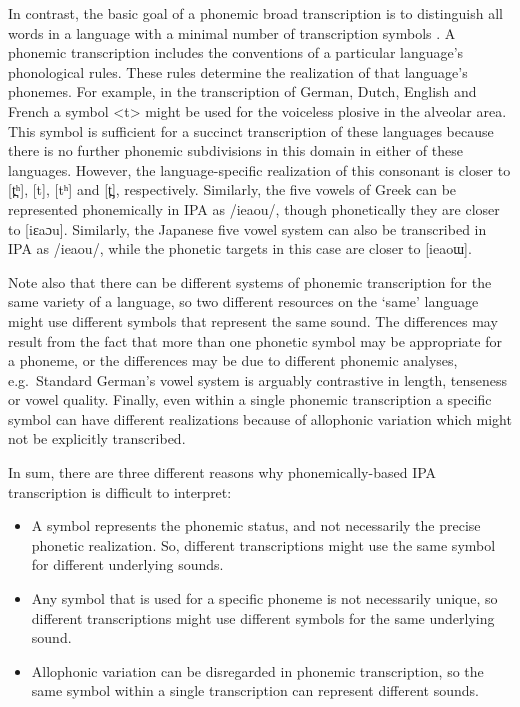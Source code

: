 In contrast, the basic goal of a phonemic broad transcription is to distinguish all
words in a language with a minimal number of transcription symbols
\citep[19]{Abercrombie1964}. A phonemic transcription includes the conventions
of a particular language's phonological rules. These rules determine the
realization of that language's phonemes. For example, in the transcription of
German, Dutch, English and French a symbol <t> might be used for the voiceless
plosive in the alveolar area. This symbol is sufficient for a succinct
transcription of these languages because there is no further phonemic
subdivisions in this domain in either of these languages. However, the
language-specific realization of this consonant is closer to [t̪ʰ], [t], [tʰ]
and [t̪], respectively. Similarly, the five vowels of Greek can be represented
phonemically in IPA as /ieaou/, though phonetically they are closer to [iεaɔu].
Similarly, the Japanese five vowel system can also be transcribed in IPA as
/ieaou/, while the phonetic targets in this case are closer to [ieaoɯ].

Note also that there can be different systems of phonemic transcription for the
same variety of a language, so two different resources on the `same' language
might use different symbols that represent the same sound. The differences may
result from the fact that more than one phonetic symbol may be appropriate for a
phoneme, or the differences may be due to different phonemic analyses, e.g.\
Standard German's vowel system is arguably contrastive in length, tenseness or
vowel quality. Finally, even within a single phonemic transcription a specific
symbol can have different realizations because of allophonic variation which 
might not be explicitly transcribed.

In sum, there are three different reasons why phonemically-based IPA 
transcription is difficult to interpret:

\begin{itemize}
  
   \item A symbol represents the phonemic status, and not necessarily the
         precise phonetic realization. So, different transcriptions might use 
         the same symbol for different underlying sounds.
   \item Any symbol that is used for a specific phoneme is not necessarily
         unique, so different transcriptions might use different symbols for the
         same underlying sound.
   \item Allophonic variation can be disregarded in phonemic transcription, so
         the same symbol within a single transcription can represent different
         sounds.
  
\end{itemize}


